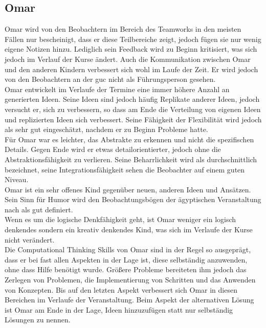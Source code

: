 \subsection*{Omar}
Omar wird von den Beobachtern im Bereich des Teamworks in den meisten Fällen nur bescheinigt, dass er diese Teilbereiche zeigt, jedoch fügen sie nur wenig eigene Notizen hinzu. Lediglich sein Feedback wird zu Beginn kritisiert, was sich jedoch im Verlauf der Kurse ändert. Auch die Kommunikation zwischen Omar und den anderen Kindern verbessert sich wohl im Laufe der Zeit. Er wird jedoch von den Beobachtern an der \acrshort{guc} nicht als Führungsperson gesehen.\\
Omar entwickelt im Verlaufe der Termine eine immer höhere Anzahl an generierten Ideen. Seine Ideen sind jedoch häufig Replikate anderer Ideen, jedoch versucht er, sich zu verbessern, so dass am Ende die Verteilung von eigenen Ideen und replizierten Ideen sich verbessert. Seine Fähigkeit der Flexibilität wird jedoch als sehr gut eingeschätzt, nachdem er zu Beginn Probleme hatte.\\
Für Omar war es leichter, das Abstrakte zu erkennen und nicht die spezifischen Details. Gegen Ende wird er etwas detailorientierter, jedoch ohne die Abstraktionsfähigkeit zu verlieren. Seine Beharrlichkeit wird als durchschnittlich bezeichnet, seine Integrationsfähigkeit sehen die Beobachter auf einem guten Niveau.\\
Omar ist ein sehr offenes Kind gegenüber neuen, anderen Ideen und Ansätzen. Sein Sinn für Humor wird den Beobachtungsbögen der ägyptischen Veranstaltung nach als gut definiert.\\
Wenn es um die logische Denkfähigkeit geht, ist Omar weniger ein logisch denkendes sondern ein kreativ denkendes Kind, was sich im Verlaufe der Kurse nicht verändert.\\
Die Computational Thinking Skills von Omar sind in der Regel so ausgeprägt, dass er bei fast allen Aspekten in der Lage ist, diese selbständig anzuwenden, ohne dass Hilfe benötigt wurde. Größere Probleme bereiteten ihm jedoch das Zerlegen von Problemen, die Implementierung von Schritten und das Anwenden von Konzepten. Bis auf den letzten Aspekt verbessert sich Omar in diesen Bereichen im Verlaufe der Veranstaltung. Beim Aspekt der alternativen Lösung ist Omar am Ende in der Lage, Ideen hinzuzufügen statt nur selbständig Lösungen zu nennen.
